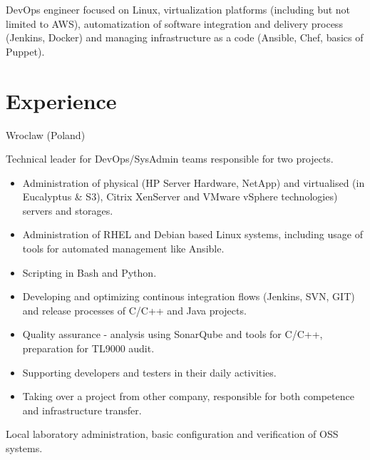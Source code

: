 \documentclass[11pt,a4paper,sans]{moderncv}
\begin{document}
\makecvtitle
DevOps engineer focused on Linux, virtualization platforms (including but not limited to AWS), %
automatization of software integration and delivery process (Jenkins, Docker) and managing infrastructure as a code (Ansible, Chef, basics of Puppet).


\section{Experience}
%
    {Wroclaw (Poland)}{}{Technical leader for DevOps/SysAdmin teams responsible for two projects.
\begin{itemize}
    \item Administration of physical (HP Server Hardware, NetApp) and virtualised (in Eucalyptus \& S3), %
        Citrix XenServer and VMware vSphere technologies) servers and storages.
    \item Administration of RHEL and Debian based Linux systems, including usage of tools for automated management like Ansible.
    \item Scripting in Bash and Python.
    \item Developing and optimizing continous integration flows (Jenkins, SVN, GIT) and release processes of C/C++ and Java projects.
    \item Quality assurance - analysis using SonarQube and tools for C/C++, preparation for TL9000 audit.
    \item Supporting developers and testers in their daily activities.
    \item Taking over a project from other company, responsible for both competence and infrastructure transfer.
\end{itemize}
}
%
    {Local laboratory administration, basic configuration and verification of OSS systems.}
\end{document}
